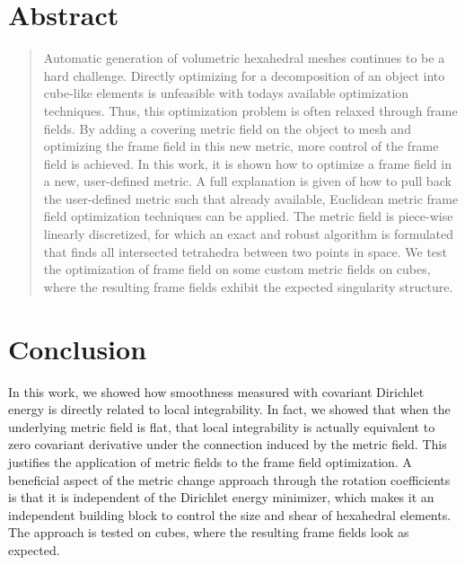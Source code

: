 \documentclass[a4paper,twoside,openright,11pt]{report}
\begin{document}
\chapter*{\centering Abstract}
\begin{quote}\noindent
  Automatic generation of volumetric hexahedral meshes continues
  to be a hard challenge. Directly optimizing for a decomposition 
  of an object into cube-like elements is unfeasible with todays
  available optimization techniques. Thus, this optimization problem is
  often relaxed through frame fields. By adding a covering
  metric field on the object to mesh and optimizing the frame field
  in this new metric, more control of the frame field is achieved.
  In this work, it is shown how to optimize a frame field in a
  new, user-defined metric. A full explanation is given of how to pull back
  the user-defined metric such that already available, Euclidean metric frame field
  optimization techniques can be applied. The metric field is
  piece-wise linearly discretized, for which an exact and robust algorithm
  is formulated that finds all intersected tetrahedra between two points in space.
  We test the optimization of frame field on some custom metric fields
  on cubes, where the resulting frame fields exhibit the expected singularity structure.

\end{quote}

\cleardoublepage


\tableofcontents


\cleardoublepage









\chapter{Conclusion}
\label{ch:conclusion}
In this work, we showed how smoothness measured with covariant Dirichlet
energy is directly related to local integrability. In fact, we showed
that when the underlying metric field is flat, that local integrability
is actually equivalent to zero covariant derivative under the connection
induced by the metric field. This justifies
the application of metric fields to the frame field optimization.
A beneficial aspect of the metric change approach through the rotation coefficients is that it
is independent of the Dirichlet energy minimizer, which makes it an
independent building block to control the size and shear of hexahedral elements. 
The approach is tested on cubes, where the resulting frame fields
look as expected.
\end{document}
